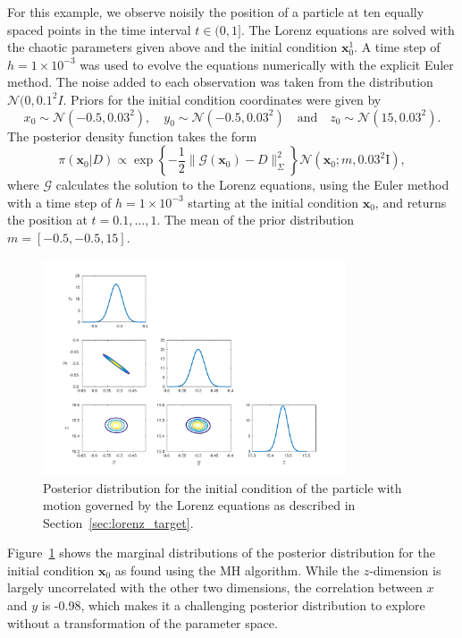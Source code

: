 \documentclass[final]{siamltex}
\begin{document}
For this example, we observe noisily the position of a particle at ten
equally spaced points in the time interval $t \in (0, 1]$. The Lorenz
equations are solved with the chaotic parameters given above and the
initial condition $\mathbf{x}_0^1$. A time step of $h=1\times 10^{-3}$
was used to evolve the equations numerically with the explicit Euler
method. The noise added to each observation was taken from the
distribution $\mathcal{N}(0, 0.1^2I$. Priors for the initial condition
coordinates were given by
\[
	x_0 \sim \mathcal{N}(-0.5, 0.03^2), \quad y_0 \sim\mathcal{N}(-0.5, 0.03^2) \quad \text{and} \quad z_0 \sim \mathcal{N}(15, 0.03^2).
\]
The posterior density function takes the form
\[
	\pi(\mathbf{x}_0|D) \propto \exp\left\{-\frac{1}{2}\|\mathcal{G}(\mathbf{x}_0) - D\|^2_\Sigma\right\}\mathcal{N}(\mathbf{x}_0; m, 0.03^2\text{I}),
\]
where $\mathcal{G}$ calculates the solution to the Lorenz equations, using the Euler method with a time step of $h=1\times 10^{-3}$ starting at the initial condition $\mathbf{x}_0$, and returns the position at $t = 0.1, ..., 1$. The mean of the prior distribution $m = [-0.5, -0.5, 15]$.

\begin{figure}[htb]
\centering
\includegraphics[width=0.8\textwidth]{"figures/Lorenz_posterior"}
\caption{Posterior distribution for the initial condition of the particle with motion governed by the Lorenz equations as described in Section~\ref{sec:lorenz_target}.}
\label{fig:Lorenz_posterior}
\end{figure}

Figure~\ref{fig:Lorenz_posterior} shows the marginal distributions of the posterior distribution for the initial condition $\mathbf{x}_0$ as found using the MH algorithm. While the $z$-dimension is largely uncorrelated with the other two dimensions, the correlation between $x$ and $y$ is -0.98, which makes it a challenging posterior distribution to explore without a transformation of the parameter space.
\end{document}

